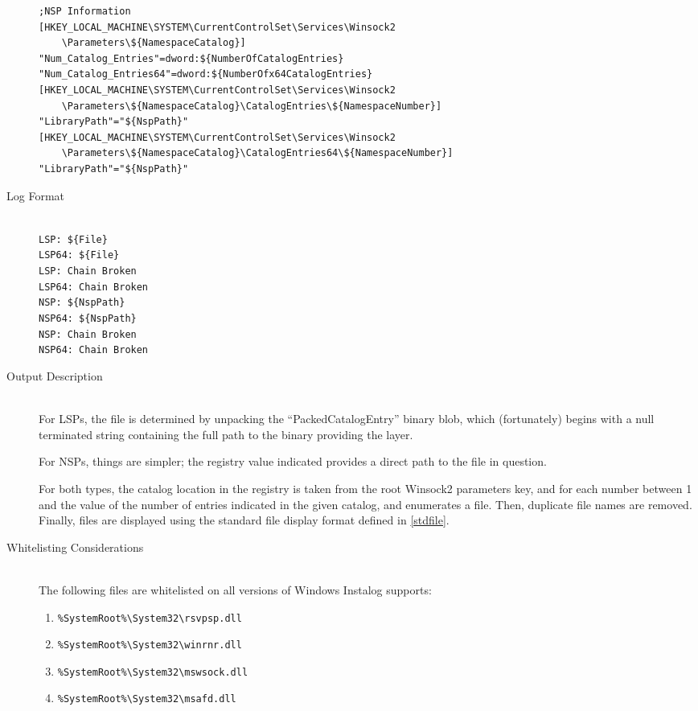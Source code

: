 \begin{description}
\begin{verbatim}
;NSP Information
[HKEY_LOCAL_MACHINE\SYSTEM\CurrentControlSet\Services\Winsock2
    \Parameters\${NamespaceCatalog}]
"Num_Catalog_Entries"=dword:${NumberOfCatalogEntries}
"Num_Catalog_Entries64"=dword:${NumberOfx64CatalogEntries}
[HKEY_LOCAL_MACHINE\SYSTEM\CurrentControlSet\Services\Winsock2
    \Parameters\${NamespaceCatalog}\CatalogEntries\${NamespaceNumber}]
"LibraryPath"="${NspPath}"
[HKEY_LOCAL_MACHINE\SYSTEM\CurrentControlSet\Services\Winsock2
    \Parameters\${NamespaceCatalog}\CatalogEntries64\${NamespaceNumber}]
"LibraryPath"="${NspPath}"
\end{verbatim}
\item[Log Format] \hfill \\
\verb|LSP: ${File}| \\
\verb|LSP64: ${File}| \\
\verb|LSP: Chain Broken| \\
\verb|LSP64: Chain Broken| \\
\verb|NSP: ${NspPath}| \\
\verb|NSP64: ${NspPath}| \\
\verb|NSP: Chain Broken| \\
\verb|NSP64: Chain Broken|
\item[Output Description] \hfill \\
For LSPs, the file is determined by unpacking the ``PackedCatalogEntry'' binary
blob, which (fortunately) begins with a null terminated string containing the
full path to the binary providing the layer.

For NSPs, things are simpler; the registry value indicated provides a direct
path to the file in question.

For both types, the catalog location in the registry is taken from the root
Winsock2 parameters key, and for each number between 1 and the value of the
number of entries indicated in the given catalog, and enumerates a file. Then,
duplicate file names are removed. Finally, files are displayed using the
standard file display format defined in \ref{stdfile}.
\item[Whitelisting Considerations] \hfill \\
The following files are whitelisted on all versions of Windows Instalog
supports:
\begin{enumerate}
    \item \verb|%SystemRoot%\System32\rsvpsp.dll|
    \item \verb|%SystemRoot%\System32\winrnr.dll|
    \item \verb|%SystemRoot%\System32\mswsock.dll|
    \item \verb|%SystemRoot%\System32\msafd.dll|
\end{enumerate}


\end{description}
